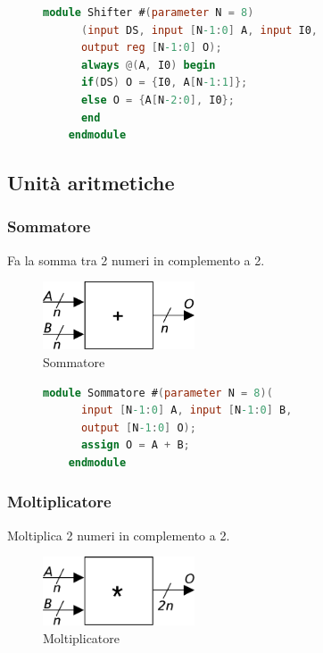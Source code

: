 \documentclass[a4paper]{article}
\theoremstyle{break}
\theoremstyle{break}
\theoremstyle{break}
\theoremstyle{break}
\begin{document}
\begin{figure}[H]
  \begin{lstlisting}[language=Verilog]
    module Shifter #(parameter N = 8)
      (input DS, input [N-1:0] A, input I0,
      output reg [N-1:0] O);
      always @(A, I0) begin
      if(DS) O = {I0, A[N-1:1]};
      else O = {A[N-2:0], I0};
      end
    endmodule
  \end{lstlisting}
\end{figure}

\subsection{Unità aritmetiche}
\subsubsection{Sommatore}
Fa la somma tra 2 numeri in complemento a 2.
\begin{figure}[H]
  \begin{center}
    \includegraphics[width=0.40\textwidth]{figures/sum}
  \end{center}
  \caption{Sommatore}
\end{figure}

\begin{figure}[H]
  \begin{lstlisting}[language=Verilog]
    module Sommatore #(parameter N = 8)(
      input [N-1:0] A, input [N-1:0] B,
      output [N-1:0] O);
      assign O = A + B;
    endmodule
  \end{lstlisting}
\end{figure}


\subsubsection{Moltiplicatore}
Moltiplica 2 numeri in complemento a 2.
\begin{figure}[H]
  \begin{center}
    \includegraphics[width=0.40\textwidth]{figures/mul}
  \end{center}
  \caption{Moltiplicatore}
\end{figure}
\end{document}
